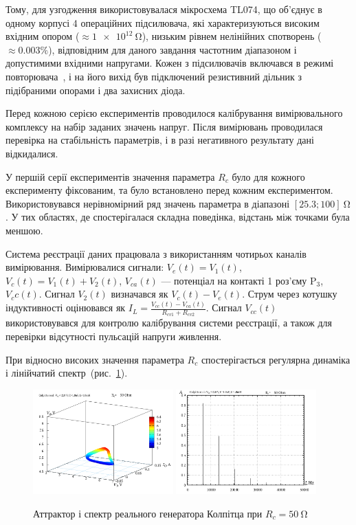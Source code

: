 Тому, для узгодження використовувалася мікросхема TL074, що
об'єднує в одному корпусі 4 операційних підсилювача, які
характеризуються високим вхідним опором ($ \approx \SI{1e12}{\ohm} $),
низьким рівнем нелінійних спотворень ($ \approx 0.003 \% $),
відповідним для даного завдання частотним
діапазоном і допустимими вхідними напругами. Кожен з
підсилювачів включався в режимі повторювача~\cite{horowitz}, і на
його вихід був підключений резистивний дільник з підібраними
опорами і два захисних діода.

Перед кожною серією експериментів проводилося калібрування
вимірювального комплексу на набір заданих значень напруг. Після
вимірювань проводилася перевірка на стабільність параметрів,
і в разі негативного результату дані відкидалися.


У першій серії експериментів значення параметра
$ R_c $ було для кожного експерименту фіксованим, та було встановлено
перед кожним експериментом. Використовувався нерівномірний
ряд значень параметра в діапазоні
$ [25.3; 100] \SI{}{\ohm} $. У тих областях, де спостерігалася складна
поведінка, відстань між точками була меншою.

Система реєстрації даних працювала з використанням чотирьох
каналів вимірювання. Вимірювалися сигнали:
$V_e(t) = V_1(t)$,
$V_c(t) = V_1(t) + V_2(t)$,
$V_{ca}(t)$ ---
потенціал на контакті 1 роз'єму $ \mathrm{P}_3 $,
$V_cc(t)$.
Сигнал
$ V_2 (t) $ визначався як
$ V_c (t) - V_e (t) $. Струм через котушку індуктивності оцінювався як
$ I_L = \frac{V_{cc} (t) - V_{ca} (t)}{R_{cv1} + R_{cv2}} $. Сигнал
$ V_{cc} (t) $ використовувався для контролю калібрування системи
реєстрації, а також для перевірки відсутності пульсацій напруги
живлення.



При відносно високих значення параметра
$ R_c $ спостерігається регулярна динаміка і лінійчатий
спектр~(рис.~\ref{atu:f:colp_r_attr_f_50}).

\begin{figure}[htb!]
  \centerline{
    \includegraphics[width=0.48\textwidth]{p/r/v1iv2_050000.png}
    \hfill
    \includegraphics[width=0.48\textwidth]{p/r/f_050000.png}
  }
\caption{Аттрактор і спектр реального генератора Колпітца при $ R_c = \SI{50}{\ohm} $}
\label{atu:f:colp_r_attr_f_50}
\end{figure}

